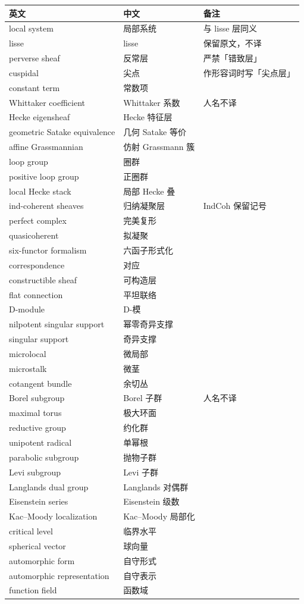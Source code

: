 \begin{center}
\small
\begin{tabular}{lll}
\hline
英文 & 中文 & 备注 \\
\hline
local system & 局部系统 & 与 lisse 层同义 \\
lisse & lisse & 保留原文，不译 \\
perverse sheaf & 反常层 & 严禁「错致层」 \\
cuspidal & 尖点 & 作形容词时写「尖点层」 \\
constant term & 常数项 & \\
Whittaker coefficient & Whittaker 系数 & 人名不译 \\
Hecke eigensheaf & Hecke 特征层 & \\
geometric Satake equivalence & 几何 Satake 等价 & \\
affine Grassmannian & 仿射 Grassmann 簇 & \\
loop group & 圈群 & \\
positive loop group & 正圈群 & \\
local Hecke stack & 局部 Hecke 叠 & \\
ind-coherent sheaves & 归纳凝聚层 & IndCoh 保留记号 \\
perfect complex & 完美复形 & \\
quasicoherent & 拟凝聚 & \\
six-functor formalism & 六函子形式化 & \\
correspondence & 对应 & \\
constructible sheaf & 可构造层 & \\
flat connection & 平坦联络 & \\
D-module & D-模 & \\
nilpotent singular support & 幂零奇异支撑 & \\
singular support & 奇异支撑 & \\
microlocal & 微局部 & \\
microstalk & 微茎 & \\
cotangent bundle & 余切丛 & \\
Borel subgroup & Borel 子群 & 人名不译 \\
maximal torus & 极大环面 & \\
reductive group & 约化群 & \\
unipotent radical & 单幂根 & \\
parabolic subgroup & 抛物子群 & \\
Levi subgroup & Levi 子群 & \\
Langlands dual group & Langlands 对偶群 & \\
Eisenstein series & Eisenstein 级数 & \\
Kac--Moody localization & Kac--Moody 局部化 & \\
critical level & 临界水平 & \\
spherical vector & 球向量 & \\
automorphic form & 自守形式 & \\
automorphic representation & 自守表示 & \\
function field & 函数域 & \\
\hline
\end{tabular}
\end{center}

